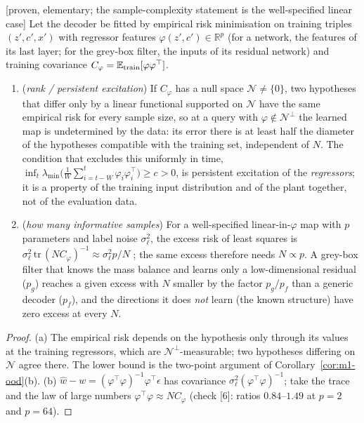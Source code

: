 \begin{proposition}\label{prop:m4-learning}
[proven, elementary; the sample-complexity statement is the well-specified linear case] Let the decoder be fitted by
empirical risk minimisation on training triples $(z',c',x')$ with regressor features $\varphi(z',c')\in\mathbb R^p$
(for a network, the features of its last layer; for the grey-box filter, the inputs of its residual network) and
training covariance $C_\varphi=\mathbb E_{\rm train}[\varphi\varphi^\top]$.
\begin{enumerate}
\item[(a)] (\emph{rank / persistent excitation}) If $C_\varphi$ has a null space $\mathcal N\ne\{0\}$, two
hypotheses that differ only by a linear functional supported on $\mathcal N$ have the same empirical risk for every
sample size, so at a query with $\varphi\notin\mathcal N^\perp$ the learned map is undetermined by the data: its
error there is at least half the diameter of the hypotheses compatible with the training set, independent of $N$.
The condition that excludes this uniformly in time, $\inf_t\lambda_{\min}\big(\tfrac1W\sum_{i=t-W}^t\varphi_i\varphi_i^\top\big)\ge c>0$,
is persistent excitation of the \emph{regressors}; it is a property of the training input distribution and of
the plant together, not of the evaluation data.
\item[(b)] (\emph{how many informative samples}) For a well-specified linear-in-$\varphi$ map with $p$ parameters
and label noise $\sigma_\ell^2$, the excess risk of least squares is $\sigma_\ell^2\,\mathrm{tr}\,(N C_\varphi)^{-1}\approx\sigma_\ell^2p/N$
\citep[Ch.~3]{hastie2009elements}; the same excess therefore needs $N\propto p$. A grey-box filter that knows the
mass balance and learns only a low-dimensional residual ($p_g$) reaches a given excess with $N$ smaller by the
factor $p_g/p_f$ than a generic decoder ($p_f$), and the directions it does \emph{not} learn (the known structure)
have zero excess at every $N$.
\end{enumerate}
\end{proposition}
\begin{proof}
(a) The empirical risk depends on the hypothesis only through its values at the training regressors, which are
$\mathcal N^\perp$-measurable; two hypotheses differing on $\mathcal N$ agree there. The lower bound is the
two-point argument of Corollary~\ref{cor:m1-ood}(b). (b) $\hat w-w=(\varphi^\top\varphi)^{-1}\varphi^\top\epsilon$
has covariance $\sigma_\ell^2(\varphi^\top\varphi)^{-1}$; take the trace and the law of large numbers
$\varphi^\top\varphi\approx NC_\varphi$ (check [6]: ratios $0.84$--$1.49$ at $p=2$ and $p=64$).
\end{proof}
